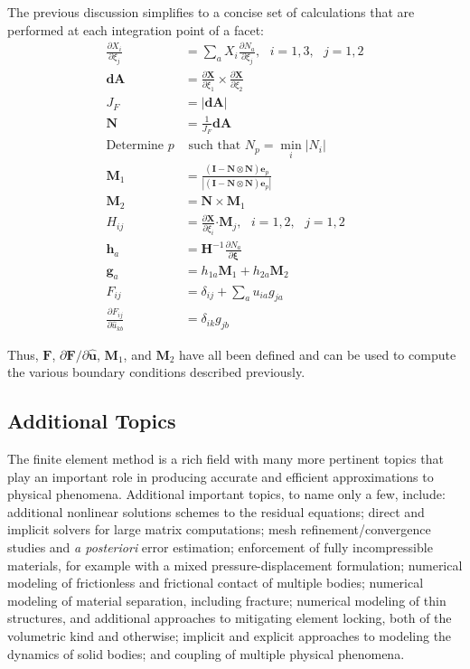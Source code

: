 The previous discussion simplifies to a concise set of calculations that are performed at each integration point of a facet:
\begin{align}
\frac{\partial X_{i}}{\partial \xi_j} &= \sum_a X_{i}\frac{\partial N_a}{\partial \xi_j}, \text{\ \ \ \ }i=1,3, \text{\ \ }j = 1,2 \\
{\bm{dA}} &= \frac{\partial{\bm{X}}}{\partial \xi_1} \times \frac{\partial {\bm {X}}}{\partial \xi_2} \\
J_F &= | {\bm {dA}}| \\
{\bm N} &= \frac{1}{J_F}{\bm {dA}} \\
\text{Determine } p &\text{ such that } N_p = \min_i{|N_i|} \\
{\bm M}_1 &=\frac{ ({\bm I} - {\bm N}\otimes{\bm N}){\bm e}_p}{|({\bm I} - {\bm N}\otimes{\bm N}){\bm e}_p|} \\
{\bm M}_2 &= {\bm N} \times {\bm M}_1 \\
H_{ij} &= \frac{\partial {\bm X}}{\partial \xi_i} \bm{\cdot} {\bm M}_j, \text{\ \ \ \ }i=1,\text{2}, \text{\ \ }j = 1,\text{2} \\
{\bm h}_a &= {\bm H}^{-1} \frac{\partial N_a}{\partial {\bm \xi}} \\
{\bm g}_a &= h_{1a}{\bm M}_1 + h_{2a}{\bm M}_2 \\
F_{ij} &= \delta_{ij} + \sum_a{u_{ia}g_{ja}} \\
\frac{\partial F_{ij}}{\partial \hat{u}_{kb}} &= \delta_{ik}g_{jb}
\end{align}

Thus, $\bm{F}$, ${\partial \bm{F}}/{\partial \hat{\bm{u}}}$, $\bm{M}_1$, and $\bm{M}_2$ have all been defined and can be used to compute the various boundary conditions described previously.

\subsection{Additional Topics}
The finite element method is a rich field with many more pertinent topics that play an important role in producing accurate and efficient approximations to physical phenomena. Additional important topics, to name only a few, include: additional nonlinear solutions schemes to the residual equations; direct and implicit solvers for large matrix computations; mesh refinement/convergence studies and \textit{a posteriori} error estimation; 
enforcement of fully incompressible materials, for example with a mixed pressure-displacement formulation; numerical modeling of frictionless and frictional contact of multiple bodies; numerical modeling of material separation, including fracture; numerical modeling of thin structures, and additional approaches to mitigating element locking, both of the volumetric kind and otherwise; implicit and explicit approaches to modeling the dynamics of solid bodies; and coupling of multiple physical phenomena. 

